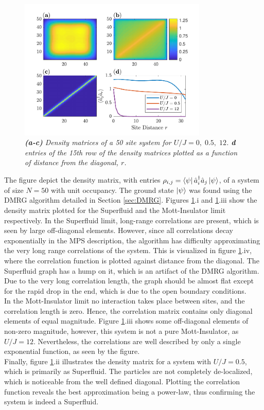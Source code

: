 \begin{figure}[h!]
    \centering
    \includegraphics[width=0.8\textwidth]{Figures/DensityMatrices.pdf}
    \caption{\textit{\textbf{(a-c)} Density matrices of a 50 site system for $U/J = 0, \; 0.5, \; 12$. \textbf{d} entries of the 15th row of the density matrices plotted as a function of distance from the diagonal, $r$. }}
    \label{fig:DensityMatrices}
\end{figure}
The figure depict the density matrix, with entries $\rho_{i,j} = \bra{\psi} \hat{a}_{i}^{\dag} \hat{a}_{j} \ket{\psi}$, of a system of size $N = 50$ with unit occupancy. The ground state $\ket{\psi}$ was found using the DMRG algorithm detailed in Section \ref{sec:DMRG}.
Figures \ref{fig:DensityMatrices}.i and \ref{fig:DensityMatrices}.iii show the density matrix plotted for the Superfluid and the Mott-Insulator limit respectively. In the Superfluid limit, long-range correlations are present, which is seen by large off-diagonal elements. However, since all correlations decay exponentially in the MPS description, the algorithm has difficulty approximating the very long range correlations of the system. This is visualized in figure \ref{fig:DensityMatrices}.iv, where the correlation function is plotted against distance from the diagonal. The Superfluid graph has a hump on it, which is an artifact of the DMRG algorithm. Due to the very long correlation length, the graph should be almost flat except for the rapid drop in the end, which is due to the open boundary conditions.\\
In the Mott-Insulator limit no interaction takes place between sites, and the correlation length is zero. Hence, the correlation matrix contains only diagonal elements of equal magnitude. Figure \ref{fig:DensityMatrices}.iii shows some off-diagonal elements of non-zero magnitude, however, this system is not a pure Mott-Insulator, as $U/J = 12$. Nevertheless, the correlations are well described by only a single exponential function, as seen by the figure.\\
Finally, figure \ref{fig:DensityMatrices}.ii illustrates the density matrix for a system with $U/J = 0.5$, which is primarily as Superfluid. The particles are not completely de-localized, which is noticeable from the well defined diagonal. Plotting the correlation function reveals the best approximation being a power-law, thus confirming the system is indeed a Superfluid. 



